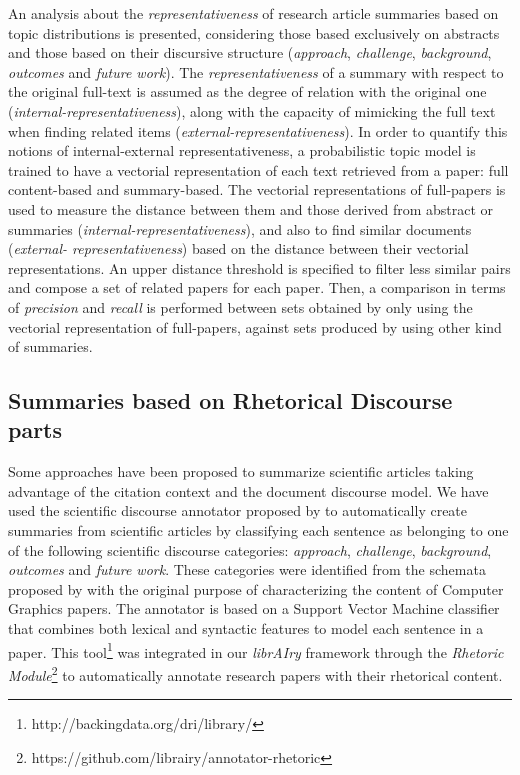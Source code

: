 An analysis about the \textit{representativeness} of research article summaries based on topic distributions is presented, considering those based exclusively on abstracts and those based on their discursive structure (\textit{approach}, \textit{challenge}, \textit{background}, \textit{outcomes} and \textit{future work})\citep{SimoneTeufel2010}. The \textit{representativeness} of a summary with respect to the original full-text is assumed as the degree of relation with the original one (\textit{internal-representativeness}), along with the capacity of mimicking the full text when finding related items (\textit{external-representativeness}). In order to quantify this notions of internal-external representativeness, a probabilistic topic model is trained to have a vectorial representation of each text retrieved from a paper: full content-based and summary-based. The vectorial representations of full-papers is used to measure the distance between them and those derived from abstract or summaries (\textit{internal-representativeness}), and also to find similar documents (\textit{external- representativeness}) based on the distance between their vectorial representations. An upper distance threshold is specified to filter less similar pairs and compose a set of related papers for each paper. Then, a comparison in terms of \textit{precision} and \textit{recall} is performed between sets obtained by only using the vectorial representation of full-papers, against sets produced by using other kind of summaries.

\subsection{Summaries based on Rhetorical Discourse parts}
\label{sec:annotator}
Some approaches have been proposed to summarize scientific articles \citep{Cohan2015} taking advantage of the citation context and the document discourse model. We have used the scientific discourse annotator proposed by \citep{Ronzano2015} to automatically create summaries from scientific articles by classifying each sentence as belonging to one of the following scientific discourse categories: \textit{approach}, \textit{challenge},  \textit{background}, \textit{outcomes} and \textit{future work}. These categories were identified from the schemata proposed by \citep{Teufel2009} with the original purpose of characterizing the content of Computer Graphics papers. The annotator is based on a Support Vector Machine classifier that combines both lexical and syntactic features to model each sentence in a paper. This tool\footnote{http://backingdata.org/dri/library/} was integrated in our \textit{librAIry} framework through the \textit{Rhetoric Module}\footnote{https://github.com/librairy/annotator-rhetoric} to automatically annotate research papers with their rhetorical content.

